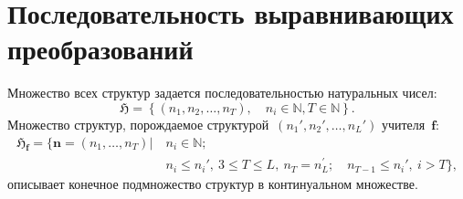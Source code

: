\section{Последовательность выравнивающих преобразований}

Множество всех структур задается последовательностью натуральных чисел:
\[
\mathfrak{H} = \left\{(n_1, n_2, \ldots, n_{T}), \quad n_i \in \mathbb{N}, T \in \mathbb{N}\right\}.
\]
Множество структур, порождаемое структурой~$(n_{1}', n_{2}', \ldots, n_{L}')$ учителя~$\mathbf{f}$:
\[
\begin{aligned}
    \mathfrak{H}_{\mathbf{f}} = \Big\{\mathbf{n} = \left(n_1, \ldots, n_{T}\right)|~&n_i \in \mathbb{N}; \\
    & n_i \leq n_{i}',~3\leq T\leq L,~n_{T}=n^{'}_{L}; \quad n_{T-1} \leq n_{i}',~i > T\Big\},
\end{aligned}
\]
описывает конечное подмножество структур в континуальном множестве.


